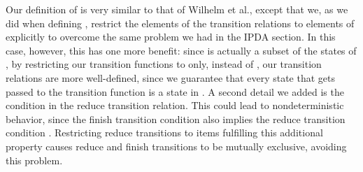 \begin{isabellebody}
\begin{isamarkuptext}
Our definition of  is very similar to that of Wilhelm et al., except that we, as we did when
defining , restrict the elements of the transition relations to elements of  explicitly
to overcome the same problem we had in the IPDA section. In this case, however, this has one more
benefit: since  is actually a subset of the states of , by restricting our transition functions
to  only, instead of , our transition relations are more well-defined, since we
guarantee that every state that gets passed to the  transition function is a state in 
. A second detail we added is the condition  in the reduce transition 
relation. This could lead to nondeterministic behavior, since the finish transition condition 
 also implies the reduce transition condition 
. Restricting reduce transitions to items fulfilling this additional
property causes reduce and finish transitions to be mutually exclusive, avoiding this problem.


\end{isamarkuptext}
\end{isabellebody}
